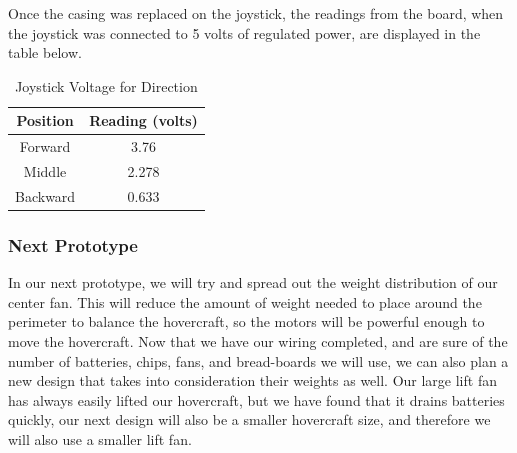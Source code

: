 Once the casing was replaced on the joystick, the readings from the board, when the joystick was connected to 5 volts of regulated power, are displayed in the table below.

\begin{table}
\caption{Joystick Voltage for Direction}
\begin{center}
\begin{tabular}{ c c }
  Position & Reading (volts) \\
  \hline
  Forward & 3.76 \\
  Middle & 2.278 \\
  Backward & 0.633 \\
\end{tabular}
\end{center}
\label{voltagePotentiometerTable}
\end{table}

\subsubsection{Next Prototype}
In our next prototype, we will try and spread out the weight distribution of our center fan. This will reduce the amount of weight needed to place around the perimeter to balance the hovercraft, so the motors will be powerful enough to move the hovercraft. Now that we have our wiring completed, and are sure of the number of batteries, chips, fans, and bread-boards we will use, we can also plan a new design that takes into consideration their weights as well. Our large lift fan has always easily lifted our hovercraft, but we have found that it drains batteries quickly, our next design will also be a smaller hovercraft size, and therefore we will also use a smaller lift fan.

